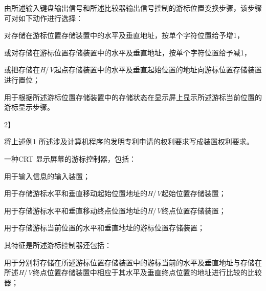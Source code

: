 {\setlength{\parindent}{20.6bp}由所述输入键盘输出信号和所述比较器输出信号控制的游标位置变换步骤，该步骤可对如下动作进行选择：\par}

{\setlength{\parindent}{20.6bp}对存储在游标位置存储装置中的水平及垂直地址，按单个字符位置给予增1，\par}

{\setlength{\parindent}{20.6bp}或对存储在游标位置存储装置中的水平及垂直地址，按单个字符位置给予减1，\par}

{\setlength{\parindent}{20.6bp}或把存储在\textit{H}/\textit{V}起点存储装置中的水平及垂直起始位置的地址向游标位置存储装置进行置位；\par}

{\setlength{\parindent}{20.6bp}用于根据所述游标位置存储装置中的存储状态在显示屏上显示所述游标当前位置的游标显示步骤。\par}

{2】\par}

{\setlength{\parindent}{20.6bp}将上述例1 所述涉及计算机程序的发明专利申请的权利要求写成装置权利要求。\par}

{\setlength{\parindent}{20.6bp}一种CRT 显示屏幕的游标控制器，包括：\par}

{\setlength{\parindent}{20.6bp}用于输入信息的输入装置；\par}

{\setlength{\parindent}{20.6bp}用于存储游标水平和垂直移动起始位置地址的\textit{H}/\textit{V}起始位置存储装置；\par}

{\setlength{\parindent}{20.6bp}用于存储游标水平和垂直移动终点位置地址的\textit{H}/\textit{V}终点位置存储装置；\par}

{\setlength{\parindent}{20.6bp}用于存储游标当前位置的水平和垂直地址的游标位置存储装置；\par}

{\setlength{\parindent}{20.6bp}其特征是所述游标控制器还包括：\par}

{\setlength{\parindent}{20.6bp}用于分别将存储在所述游标位置存储装置中的游标当前的水平及垂直地址与存储在所述\textit{H}/\textit{V}终点位置存储装置中相应于其水平及垂直终点位置的地址进行比较的比较器；\par}

